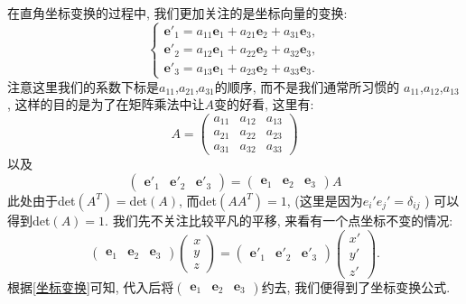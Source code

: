 \documentclass[./main.tex]{subfiles}
\begin{document}
在直角坐标变换的过程中, 我们更加关注的是坐标向量的变换: 
\[
\left\{\begin{aligned}
    \mathbf{e}'_1=a_{11}\mathbf{e}_1+a_{21}\mathbf{e}_2+a_{31}\mathbf{e}_3,\\
    \mathbf{e}'_2=a_{12}\mathbf{e}_1+a_{22}\mathbf{e}_2+a_{32}\mathbf{e}_3,\\
    \mathbf{e}'_3=a_{13}\mathbf{e}_1+a_{23}\mathbf{e}_2+a_{33}\mathbf{e}_3.
\end{aligned}\right.
\]
注意这里我们的系数下标是$a_{11}$,$a_{21}$,$a_{31}$的顺序, 而不是我们通常所习惯的
$a_{11}$,$a_{12}$,$a_{13}$, 这样的目的是为了在矩阵乘法中让$A$变的好看, 这里有:
\[A=
\begin{pmatrix}
a_{11}&a_{12}&a_{13}\\
a_{21}&a_{22}&a_{23}\\
a_{31}&a_{32}&a_{33}
\end{pmatrix}\]
以及
\begin{equation}
    \begin{pmatrix}\mathbf{e}'_1&\mathbf{e}'_2&\mathbf{e}'_3\end{pmatrix}=\begin{pmatrix}\mathbf{e}_1&\mathbf{e}_2&\mathbf{e}_3\end{pmatrix}A\label{坐标变换}
\end{equation}
此处由于det$(A^T)=$det$(A)$, 而det$(AA^T)=1$, (这里是因为$e_i'e_j'=\delta_{ij}$
) 可以得到det$(A)=1$. 
我们先不关注比较平凡的平移, 来看有一个点坐标不变的情况: 
\[
    \begin{pmatrix}\mathbf{e}_1&\mathbf{e}_2&\mathbf{e}_3\end{pmatrix}
\begin{pmatrix}
     x  \\
      y\\
      z
\end{pmatrix}
=
    \begin{pmatrix}\mathbf{e}'_1&\mathbf{e}'_2&\mathbf{e}'_3\end{pmatrix}
\begin{pmatrix}
     x'  \\
      y'\\
      z'
\end{pmatrix}.
\]
根据\eqref{坐标变换}可知, 代入后将$\begin{pmatrix}\mathbf{e}_1&\mathbf{e}_2&\mathbf{e}_3\end{pmatrix}$约去, 我们便得到了坐标变换公式. 
\end{document}
